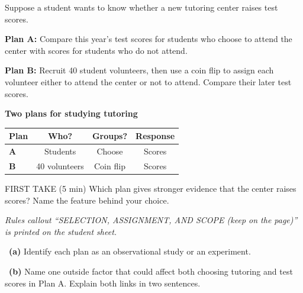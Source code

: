 \documentclass[11pt]{article}
\begin{document}
\clearpage
{}

Suppose a student wants to know whether a new tutoring center raises test scores.\par\smallskip \textbf{Plan A:} Compare this year's test scores for students who choose to attend the center with scores for students who do not attend.\par \textbf{Plan B:} Recruit 40 student volunteers, then use a coin flip to assign each volunteer either to attend the center or not to attend. Compare their later test scores.\par
\begin{center}
\textbf{Two plans for studying tutoring}\par\smallskip
\begin{tabular}{|l|c|c|c|}
\hline
\textbf{Plan} & \textbf{Who?} & \textbf{Groups?} & \textbf{Response} \\ \hline
\textbf{A} & Students & Choose & Scores \\ \hline
\textbf{B} & 40 volunteers & Coin flip & Scores \\ \hline
\end{tabular}
\end{center}
\begin{firsttakebox}{FIRST TAKE (5 min)}
Which plan gives stronger evidence that the center raises scores? Name the feature behind your choice.\par
{}
\end{firsttakebox}

\textit{Rules callout ``SELECTION, ASSIGNMENT, AND SCOPE (keep on the page)'' is printed on the student sheet.}\par\medskip

~\textbf{(a)} Identify each plan as an observational study or an experiment.\par
{}

~\textbf{(b)} Name one outside factor that could affect both choosing tutoring and test scores in Plan A. Explain both links in two sentences.\par
{}
\end{document}
